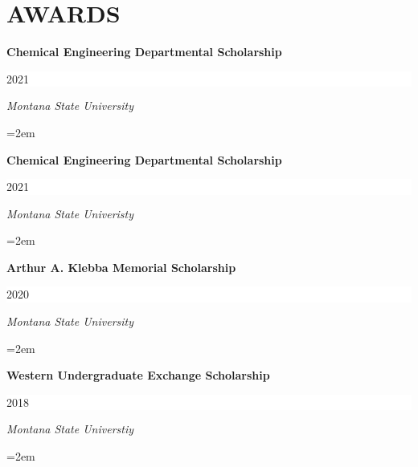 \documentclass[paper=a4,fontsize=11pt]{scrartcl} %
\newcommand{\sepspace}{\vspace*{0.5em}}		%
\newcommand{\NewPart}[1]{\section*{\uppercase{#1}}}
\newcommand{\EducationEntry}[4]{
		\noindent \textbf{#1} \hfill      %
		\colorbox{White}{%
			\parbox{12em}{%
			\hfill\color{Black}#2}} \par  %
		\noindent \textit{#3} \par        %
		\noindent\hangindent=2em\hangafter=0 \small #4 %
		\normalsize \par}
\begin{document}
\NewPart{Awards}{}

\EducationEntry{Chemical Engineering Departmental Scholarship}{2021}{Montana State University}{}
\sepspace

\EducationEntry{Chemical Engineering Departmental Scholarship}{2021}{Montana State Univeristy}{}
\sepspace

\EducationEntry{Arthur A. Klebba Memorial Scholarship}{2020}{Montana State University}{}
\sepspace
\EducationEntry{Western Undergraduate Exchange Scholarship}{2018}{Montana State Universtiy}{}
\end{document}
